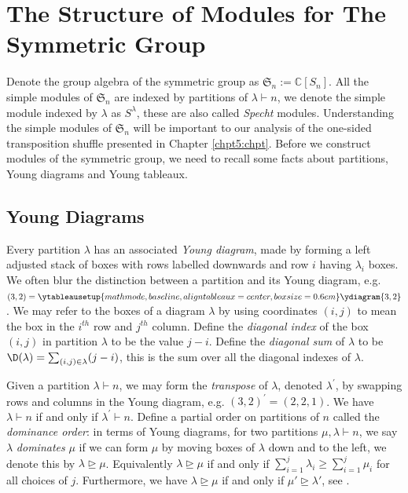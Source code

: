 \documentclass[11pt]{report}
\begin{document}
\section{The Structure of Modules for The Symmetric Group}
\label{chpt4:sec:modules}
Denote the group algebra of the symmetric group as $\mathfrak{S}_{n} := \mathbb{C}[S_{n}]$. All the 
simple modules of $\mathfrak{S}_{n}$ are indexed  by partitions of $ \lambda \vdash n$, we denote the simple module indexed by $\lambda$ as $S^{\lambda}$, these are also called \emph{Specht} modules.  Understanding the simple modules of $\mathfrak{S}_{n}$ will be important to our analysis of the one-sided transposition shuffle presented in 
Chapter \ref{chpt5:chpt}. 
Before we construct modules of the symmetric group, we need to recall some facts about partitions, Young diagrams and Young tableaux.

















\subsection{Young Diagrams}
\label{chpt4:subsec:youngdigrams}



Every partition $\lambda$ has an 
associated 
\emph{Young diagram}, 
made by forming a left adjusted stack of boxes with rows labelled downwards 
and 
row $i$ having 
$\lambda_{i}$ boxes.  We often blur the distinction between a partition and 
its Young diagram, e.g. $(3,2) = 	
\ytableausetup{mathmode,baseline,aligntableaux=center,boxsize=0.6em}
\ydiagram{3,2}$. 
We may refer to the boxes of a diagram $\lambda$ by using 
coordinates $(i,j)$ to mean the box in the $i^{th}$ row and $j^{th}$ 
column. Define the \emph{diagonal index} of the box $(i,j)$ in partition 
$\lambda$ to be the value $j-i$. Define the \emph{diagonal sum} of $\lambda$ to be $\D(\lambda) =\sum_{(i,j) \in \lambda} (j-i)$, this is the sum over all the diagonal indexes of $\lambda$.	


Given a partition $\lambda\vdash n$, we may form the 
\emph{transpose} of $\lambda$, denoted $\lambda^{\prime}$, by swapping rows 
and	columns in the Young diagram, e.g. $(3,2)^{\prime} = (2,2,1)$. We have 
$\lambda \vdash n$ if and only if 
$\lambda^{\prime} \vdash n$. Define a partial order on partitions of $n$ called the \emph{dominance order}: 
in terms of Young diagrams, for two partitions $\mu,\lambda \vdash n$, we say $\lambda$ \emph{dominates} $\mu$ 
if we can form $\mu$ by moving boxes of 
$\lambda$ down and to the left, we denote this by $\lambda \trianglerighteq \mu$. Equivalently $\lambda \trianglerighteq \mu$  if and only if $\sum_{i=1}^{j} \lambda_{i} \geq \sum_{i=1}^{j} \mu_{i}$ for all choices of $j$.
Furthermore, we have $\lambda \trianglerighteq \mu$ if and only if $\mu'  
\trianglerighteq \lambda'$, see \cite[Lemma 1.4.11]{james_1984}. 
\end{document}

